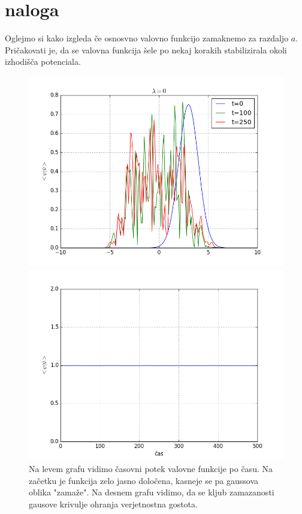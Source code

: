 \documentclass[slovene,11pt,a4paper]{article}
\numberwithin{equation}{section} %
\numberwithin{figure}{section} %
\numberwithin{table}{section} %
\begin{document}
\newpage

\section{naloga}
Oglejmo si kako izgleda če osnosvno valovno funkcijo zamaknemo za razdaljo $a$. Pričakovati je, da se valovna funkcija šele po nekaj korakih stabilizirala okoli izhodišča potenciala.


\begin{figure}[!htb]
\centering
\begin{minipage}{0.5\textwidth}
\centering
\includegraphics[scale=0.45]{slike/casovni_razvoj_izmika.png}
\end{minipage}\hfill
\begin{minipage}{0.5\textwidth}
\centering
\includegraphics[scale=0.45]{slike/ohranjanje_delcev.png}
\end{minipage}

\caption{Na levem grafu vidimo časovni potek valovne funkcije po času. Na začetku je funkcija zelo jasno določena, kasneje se pa gaussova oblika "zamaže". Na desnem grafu vidimo, da se kljub zamazanosti gausove krivulje ohranja verjetnostna gostota.}
\end{figure}
\end{document}
